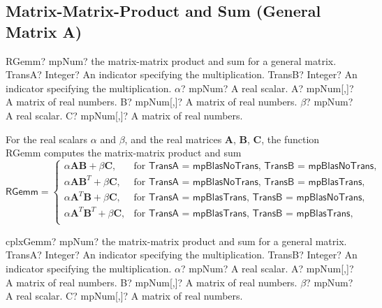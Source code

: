 \subsection{Matrix-Matrix-Product and Sum (General Matrix A)}


\begin{mpFunctionsExtract}
	\mpFunctionSeven
	{RGemm? mpNum? the matrix-matrix product and sum for a general matrix.}
	{TransA? Integer? An indicator specifying the multiplication.}
	{TransB? Integer? An indicator specifying the multiplication.}
	{$\alpha$? mpNum? A real scalar.}
	{A? mpNum[,]? A matrix of real numbers.}
	{B? mpNum[,]? A matrix of real numbers.}
	{$\beta$? mpNum? A real scalar.}
	{C? mpNum[,]? A matrix of real numbers.}
\end{mpFunctionsExtract}

\vspace{0.3cm}
For the real scalars $\alpha$ and $\beta$, and the real matrices $\boldsymbol{A}$, $\boldsymbol{B}$, $\boldsymbol{C}$, the function \textsf{RGemm} computes the matrix-matrix product and sum 
\begin{equation}
\textsf{RGemm}=\begin{cases}
\alpha \boldsymbol{A} \boldsymbol{B} + \beta \boldsymbol{C}, & \text{for } \textsf{TransA = mpBlasNoTrans, TransB = mpBlasNoTrans},\\
\alpha \boldsymbol{A} \boldsymbol{B}^T + \beta \boldsymbol{C}, & \text{for } \textsf{TransA = mpBlasNoTrans, TransB = mpBlasTrans},\\		
\alpha \boldsymbol{A}^T \boldsymbol{B} + \beta \boldsymbol{C}, & \text{for } \textsf{TransA = mpBlasTrans, TransB = mpBlasNoTrans},\\
\alpha \boldsymbol{A}^T \boldsymbol{B}^T + \beta \boldsymbol{C}, & \text{for } \textsf{TransA = mpBlasTrans, TransB = mpBlasTrans},\\
\end{cases}
\end{equation}


\newpage
\begin{mpFunctionsExtract}
	\mpFunctionSeven
	{cplxGemm? mpNum? the matrix-matrix product and sum for a general matrix.}
	{TransA? Integer? An indicator specifying the multiplication.}
	{TransB? Integer? An indicator specifying the multiplication.}
	{$\alpha$? mpNum? A real scalar.}
	{A? mpNum[,]? A matrix of real numbers.}
	{B? mpNum[,]? A matrix of real numbers.}
	{$\beta$? mpNum? A real scalar.}
	{C? mpNum[,]? A matrix of real numbers.}
\end{mpFunctionsExtract}

